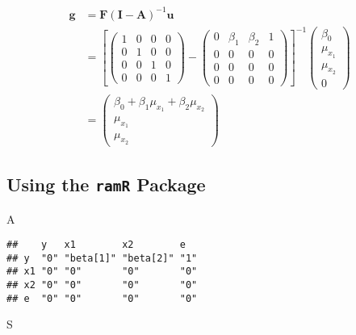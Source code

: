 \documentclass[
]{book}
\newenvironment{Shaded}{\begin{snugshade}}{\end{snugshade}}
\newcommand{\NormalTok}[1]{#1}
\theoremstyle{definition}
\theoremstyle{definition}
\theoremstyle{definition}
\theoremstyle{remark}
\begin{document}
\begin{align*}\mathbf{g} &=\mathbf{F} \left( \mathbf{I} - \mathbf{A} \right)^{-1} \mathbf{u}\\ &=\left[\left( \begin{array}{cccc} 1 & 0 & 0 & 0 \\ 0 & 1 & 0 & 0 \\ 0 & 0 & 1 & 0 \\ 0 & 0 & 0 & 1 \end{array} \right)-\left( \begin{array}{cccc} 0 & \beta  _{1} & \beta  _{2} & 1 \\ 0 & 0 & 0 & 0 \\ 0 & 0 & 0 & 0 \\ 0 & 0 & 0 & 0 \end{array} \right)\right]^{-1}\left( \begin{array}{c} \beta  _{0} \\ \mu  _{x _{1}} \\ \mu  _{x _{2}} \\ 0 \end{array} \right)\\ &=\left( \begin{array}{c} \beta  _{0} + \beta  _{1} \mu  _{x _{1}} + \beta  _{2} \mu  _{x _{2}} \\ \mu  _{x _{1}} \\ \mu  _{x _{2}} \end{array} \right)\end{align*}

\hypertarget{using-the-ramr-package-2}{%
\subsection{\texorpdfstring{Using the \texttt{ramR} Package}{Using the ramR Package}}\label{using-the-ramr-package-2}}

\begin{Shaded}
\begin{Highlighting}[]
\NormalTok{A}
\end{Highlighting}
\end{Shaded}

\begin{verbatim}
##    y   x1        x2        e  
## y  "0" "beta[1]" "beta[2]" "1"
## x1 "0" "0"       "0"       "0"
## x2 "0" "0"       "0"       "0"
## e  "0" "0"       "0"       "0"
\end{verbatim}

\begin{Shaded}
\begin{Highlighting}[]
\NormalTok{S}
\end{Highlighting}
\end{Shaded}
\end{document}

